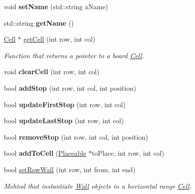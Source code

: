 \begin{DoxyCompactItemize}
void {\bfseries set\+Name} (std\+::string a\+Name)
\item 
\hypertarget{class_map_a67432b1e7f5ab087a75a74e2dd6589ec}{}\label{class_map_a67432b1e7f5ab087a75a74e2dd6589ec} 
std\+::string {\bfseries get\+Name} ()
\item 
\hypertarget{class_map_afc1c246f4bc6bde164ac2dafa79bf5fb}{}\label{class_map_afc1c246f4bc6bde164ac2dafa79bf5fb} 
\hyperlink{class_cell}{Cell} $\ast$ \hyperlink{class_map_afc1c246f4bc6bde164ac2dafa79bf5fb}{get\+Cell} (int row, int col)
\begin{DoxyCompactList}\small\item\em Function that returns a pointer to a board \hyperlink{class_cell}{Cell}. \end{DoxyCompactList}\item 
\hypertarget{class_map_a26b8b9bc68f8f7e5b4f74cbd3210dd30}{}\label{class_map_a26b8b9bc68f8f7e5b4f74cbd3210dd30} 
void {\bfseries clear\+Cell} (int row, int col)
\item 
\hypertarget{class_map_a502496d0178402534ec6701d10bbb0e6}{}\label{class_map_a502496d0178402534ec6701d10bbb0e6} 
bool {\bfseries add\+Stop} (int row, int col, int position)
\item 
\hypertarget{class_map_a382d1000a33c473bd96a619a0dd11d16}{}\label{class_map_a382d1000a33c473bd96a619a0dd11d16} 
bool {\bfseries update\+First\+Stop} (int row, int col)
\item 
\hypertarget{class_map_a0320959aa6cdae5dfe4cff3f79ebd40a}{}\label{class_map_a0320959aa6cdae5dfe4cff3f79ebd40a} 
bool {\bfseries update\+Last\+Stop} (int row, int col)
\item 
\hypertarget{class_map_a808119272b760e43615ffc396cf6feb6}{}\label{class_map_a808119272b760e43615ffc396cf6feb6} 
bool {\bfseries remove\+Stop} (int row, int col, int position)
\item 
\hypertarget{class_map_a9f10c89830337667bc392e3814b5e616}{}\label{class_map_a9f10c89830337667bc392e3814b5e616} 
bool {\bfseries add\+To\+Cell} (\hyperlink{class_placeable}{Placeable} $\ast$to\+Place, int row, int col)
\item 
bool \hyperlink{class_map_a7b5c1d8ed873a72484f27e99bcdff97a}{set\+Row\+Wall} (int row, int from, int end)
\begin{DoxyCompactList}\small\item\em Mehtod that instantiate \hyperlink{class_wall}{Wall} objects in a horizontal range \hyperlink{class_cell}{Cell}. \end{DoxyCompactList}\item 

\end{DoxyCompactItemize}
